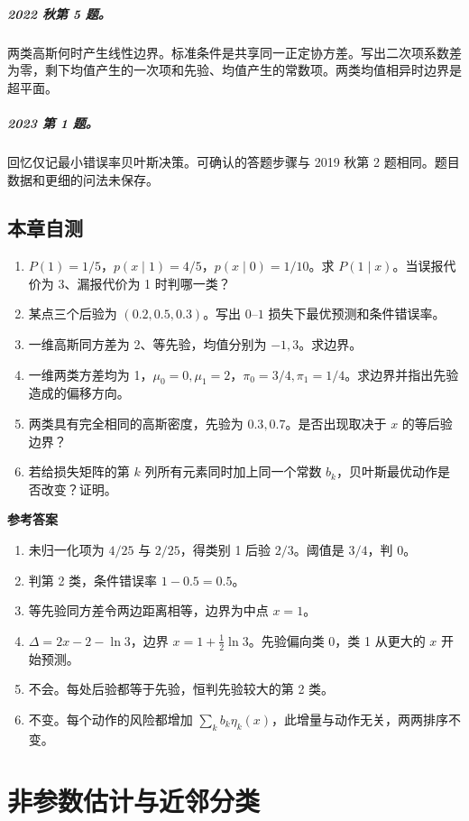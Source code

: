 \documentclass[UTF8,a4paper,zihao=-4,fontset=fandol]{ctexrep}
\begin{document}
\paragraph{2022 秋第 5 题。} 两类高斯何时产生线性边界。标准条件是共享同一正定协方差。写出二次项系数差为零，剩下均值产生的一次项和先验、均值产生的常数项。两类均值相异时边界是超平面。
\paragraph{2023 第 1 题。} 回忆仅记最小错误率贝叶斯决策。可确认的答题步骤与 2019 秋第 2 题相同。题目数据和更细的问法未保存。

\section{本章自测}
\begin{enumerate}
\item $P(1)=1/5$，$p(x\mid1)=4/5$，$p(x\mid0)=1/10$。求 $P(1\mid x)$。当误报代价为 3、漏报代价为 1 时判哪一类？
\item 某点三个后验为 $(0.2,0.5,0.3)$。写出 $0$--$1$ 损失下最优预测和条件错误率。
\item 一维高斯同方差为 2、等先验，均值分别为 $-1,3$。求边界。
\item 一维两类方差均为 1，$\mu_0=0,\mu_1=2$，$\pi_0=3/4,\pi_1=1/4$。求边界并指出先验造成的偏移方向。
\item 两类具有完全相同的高斯密度，先验为 $0.3,0.7$。是否出现取决于 $x$ 的等后验边界？
\item 若给损失矩阵的第 $k$ 列所有元素同时加上同一个常数 $b_k$，贝叶斯最优动作是否改变？证明。
\end{enumerate}
\textbf{参考答案}
\begin{enumerate}
\item 未归一化项为 $4/25$ 与 $2/25$，得类别 1 后验 $2/3$。阈值是 $3/4$，判 0。
\item 判第 2 类，条件错误率 $1-0.5=0.5$。
\item 等先验同方差令两边距离相等，边界为中点 $x=1$。
\item $\Delta=2x-2-\ln3$，边界 $x=1+\frac12\ln3$。先验偏向类 0，类 1 从更大的 $x$ 开始预测。
\item 不会。每处后验都等于先验，恒判先验较大的第 2 类。
\item 不变。每个动作的风险都增加 $\sum_k b_k\eta_k(x)$，此增量与动作无关，两两排序不变。
\end{enumerate}

\chapter{非参数估计与近邻分类}
\label{ch:prml-knn}
\end{document}
